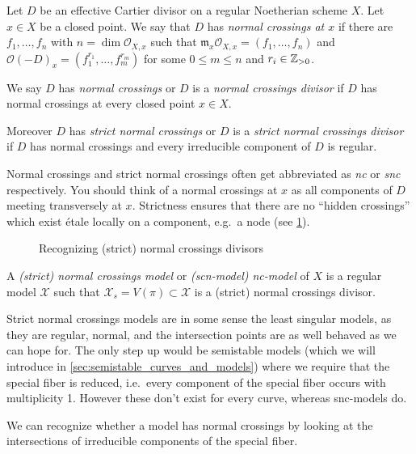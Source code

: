 \begin{definition}
	Let $D$ be an effective Cartier divisor on a regular Noetherian scheme $X$. 	Let $x \in X$ be a closed point. 
	We say that $D$ has \emph{normal crossings at $x$ } if there are $f_1, \ldots, f_n$ with $n = \dim \mathcal{O}_{X, x}$ such that $\mathfrak{m} _x \mathcal{O}_{X, x} = (f_1, \ldots, f_n)$ and $\mathcal{O}(-D)_{x} = (f_1^{r_1}, \ldots, f_m^{r_m})$ for some $0 \le m \le n$ and $r_i \in \mathbb{Z}_{> 0}$. 

	We say $D$ has \emph{normal crossings} or $D$ is a \emph{normal crossings divisor} if $D$ has normal crossings at every closed point  $x \in X$. 

	Moreover  $D$ has \emph{strict normal crossings} or $D$ is a \emph{strict normal crossings divisor} if $D$ has normal crossings and every irreducible component of $D$ is regular. 
\end{definition}
Normal crossings and strict normal crossings often get abbreviated as \emph{nc} or \emph{snc} respectively.
You should think of a normal crossings at $x$ as all components of $D$ meeting transversely at $x$. 
Strictness ensures that there are no ``hidden crossings'' which exist étale locally on a component, e.g.\ a node (see \cref{fig:normal_crossings_divisors}).

\begin{figure}[ht]
    \centering
    \caption{Recognizing (strict) normal crossings divisors}
    \label{fig:normal_crossings_divisors}
\end{figure}
\begin{definition}
	A \emph{(strict) normal crossings model} or \emph{(scn-model) nc-model}  of $X$ is a regular model $\mathscr X$ such that $\mathscr X_s = V(\pi) \subset  \mathscr X$ is a (strict) normal crossings divisor. 
\end{definition}

Strict normal crossings models are in some sense the least singular models, as they are regular, normal, and the intersection points are as well behaved as we can hope for. 
The only step up would be semistable models (which we will introduce in \cref{sec:semistable_curves_and_models}) where we require that the special fiber is reduced, i.e.\ every component of the special fiber occurs with multiplicity 1. 
However these don't exist for every curve, whereas snc-models do.

We can recognize whether a model has normal crossings by looking at the intersections of irreducible components of the special fiber. 

